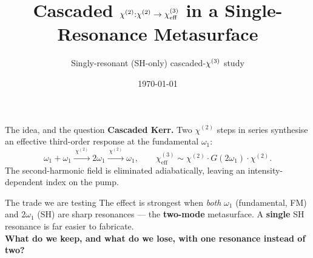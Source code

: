 \documentclass[aspectratio=169,11pt]{beamer}
\title{Cascaded $\chitwo{:}\chitwo \to \chithree_{\mathrm{eff}}$ in a
       Single-Resonance Metasurface}
\subtitle{Singly-resonant (SH-only) cascaded-$\chithree$ study}
\date{\today}
\newcommand{\chitwo}{\chi^{(2)}}
\newcommand{\chithree}{\chi^{(3)}}
\begin{document}
\maketitle

\begin{frame}{The idea, and the question}
  \textbf{Cascaded Kerr.} Two $\chitwo$ steps in series synthesise an effective
  third-order response at the fundamental $\omega_1$:
  \[
    \omega_1+\omega_1 \xrightarrow{\ \chitwo\ } 2\omega_1
    \xrightarrow{\ \chitwo\ } \omega_1 ,
    \qquad
    \chithree_{\mathrm{eff}} \sim \chitwo \!\cdot\! G(2\omega_1) \!\cdot\! \chitwo .
  \]
  The second-harmonic field is eliminated adiabatically, leaving an
  intensity-dependent index on the pump.

  \begin{alertblock}{The trade we are testing}
    The effect is strongest when \emph{both} $\omega_1$ (fundamental, FM) and
    $2\omega_1$ (SH) are sharp resonances --- the \textbf{two-mode} metasurface.
    A \textbf{single} SH resonance is far easier to fabricate. \\[2pt]
    \textbf{What do we keep, and what do we lose, with one resonance instead of two?}
  \end{alertblock}
\end{frame}
\end{document}
